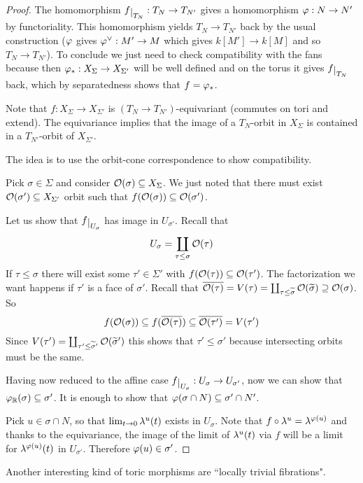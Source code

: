 \begin{proof}
The homomorphism $f\res{T_N}:T_N\to T_{N'}$ gives a homomorphism $\varphi:N\to N'$ by functoriality. This homomorphism yields $T_N\to T_{N'}$ back by the usual construction ($\varphi$ gives $\varphi^\vee:M'\to M$ which gives $k[M']\to k[M]$ and so $T_N\to T_{N'}$). To conclude we just need to check compatibility with the fans because then $\varphi_\ast:X_\Sigma\to X_{\Sigma'}$ will be well defined and on the torus it gives $f\res{T_N}$ back, which by separatedness shows that $f=\varphi_\ast$.

Note that $f:X_\Sigma\to X_{\Sigma'}$ is $(T_N\to T_{N'})$-equivariant (commutes on tori and extend). The equivariance implies that the image of a $T_N$-orbit in $X_\Sigma$ is contained in a $T_{N'}$-orbit of $X_{\Sigma'}$.

The idea is to use the orbit-cone correspondence to show compatibility.

Pick $\sigma\in \Sigma$ and consider $\mathcal{O}(\sigma)\subseteq X_{\Sigma}$. We just noted that there must exist $\mathcal{O}(\sigma')\subseteq X_{\Sigma'}$ orbit such that $f(\mathcal{O}(\sigma))\subseteq \mathcal{O}(\sigma')$.

Let us show that $f\res{U_\sigma}$ has image in $U_{\sigma'}$. Recall that
\[U_\sigma=\coprod_{\tau\leq \sigma}\mathcal{O}(\tau)\]
If $\tau\leq \sigma$ there will exist some $\tau'\in \Sigma'$ with $f(\mathcal{O}(\tau))\subseteq \mathcal{O}(\tau')$. The factorization we want happens if $\tau'$ is a face of $\sigma'$. Recall that $\overline{\mathcal{O}(\tau)}=V(\tau)=\coprod_{\tau\leq \widetilde{\sigma}}\mathcal{O}(\widetilde{\sigma})\supseteq \mathcal{O}(\sigma)$.
So 
\[f(\mathcal{O}(\sigma))\subseteq f(\overline{\mathcal{O}(\tau)})\subseteq \overline{\mathcal{O}(\tau')}=V(\tau')\]
Since $V(\tau')=\coprod_{\tau'\leq \widetilde{\sigma}'}\mathcal{O}(\widetilde{\sigma}')$ this shows that $\tau'\leq \sigma'$ because intersecting orbits must be the same.


Having now reduced to the affine case $f\res{U_\sigma}:U_\sigma\to U_{\sigma'}$, now we can show that $\varphi_{\mathbb{R}}(\sigma)\subseteq \sigma'$. It is enough to show that $\varphi(\sigma\cap N)\subseteq \sigma'\cap N'$.

Pick $u\in \sigma\cap N$, so that $\lim_{t\to 0}\lambda^u(t)$ exists in $U_\sigma$. Note that $f\circ \lambda^u=\lambda^{\varphi(u)}$ and thanks to the equivariance, the image of the limit of $\lambda^u(t)$ via $f$ will be a limit for $\lambda^{\varphi(u)}(t)$ in $U_{\sigma'}$. Therefore $\varphi(u)\in \sigma'$.
\end{proof}




Another interesting kind of toric morphisms are ``locally trivial fibrations". 

